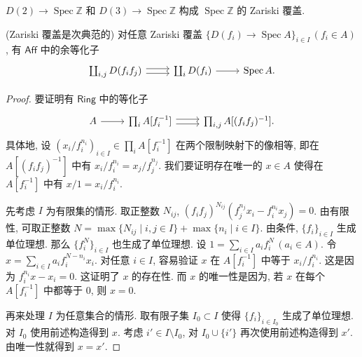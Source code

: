 \documentclass{book}
\begin{document}
	\begin{example}
		{}
		$D(2) \to\operatorname{Spec}\mathbb{Z}$ 和 $D(3) \to \operatorname{Spec} \mathbb{Z}$ 构成 $\operatorname{Spec} \mathbb{Z}$ 的 Zariski 覆盖.
	\end{example}
	
	\begin{prop}
		[label={Zariski-covering-subcanonical}]
		{(Zariski 覆盖是次典范的)}
		对任意 Zariski 覆盖 $\{D(f_i) \to \operatorname{Spec} A\}_{i\in I}\,(f_i\in A)$, 有 $\mathsf{Aff}$ 中的余等化子
		\[\begin{tikzcd}[ampersand replacement=\&]
			{\coprod_{i,j}D(f_if_j)} \& {\coprod_i D(f_i)} \& {\operatorname{Spec} A.}
			\arrow[shift right, from=1-1, to=1-2]
			\arrow[shift left, from=1-1, to=1-2]
			\arrow[from=1-2, to=1-3]
		\end{tikzcd}\]
	\end{prop}
	\begin{proof}
		要证明有 $\mathsf{Ring}$ 中的等化子
		\[\begin{tikzcd}[ampersand replacement=\&]
			A \& {\prod_i A[f_i^{-1}]} \& {\prod_{i,j}A[(f_if_j)^{-1}].}
			\arrow[from=1-1, to=1-2]
			\arrow[shift left, from=1-2, to=1-3]
			\arrow[shift right, from=1-2, to=1-3]
		\end{tikzcd}\]
		具体地, 设 $(x_i/f_i^{n_i})_{i\in I}\in \prod_i A[f_i^{-1}]$ 在两个限制映射下的像相等, 即在 $A[(f_if_j)^{-1}]$ 中有 $x_i/f_i^{n_i} = x_j/f_j^{n_j}$.
		我们要证明存在唯一的 $x\in A$ 使得在 $A[f_i^{-1}]$ 中有 $x/1=x_i/f_i^{n_i}$.
		
		先考虑 $I$ 为有限集的情形.
		取正整数 $N_{ij}$,
		$(f_if_j)^{N_{ij}} (f_j^{n_j}x_i-f_i^{n_i}x_j)=0$.
		由有限性, 可取正整数 $N=\max\{N_{ij}\mid i,j\in I\}+\max\{n_i\mid i\in I\}$.
		由条件, $\{f_i\}_{i\in I}$ 生成单位理想.
		那么 $\{f_i^N\}_{i\in I}$ 也生成了单位理想.
		设 $1=\sum_{i\in I} a_if_i^N\,(a_i\in A)$.
		令 $x = \sum_{i\in I} a_if_i^{N-n_i}x_i$.
		对任意 $i\in I$,
		容易验证 $x$ 在 $A[f_i^{-1}]$ 中等于 $x_i/f_i^{n_i}$.%
		这是因为 $f_i^{n_i}x-x_i=0$.
		这证明了 $x$ 的存在性.
		而 $x$ 的唯一性是因为, 若 $x$ 在每个 $A[f_i^{-1}]$ 中都等于 $0$, 则 $x=0$.
		
		再来处理 $I$ 为任意集合的情形. 取有限子集 $I_0\subset I$ 使得 $\{f_i\}_{i\in I_0}$ 生成了单位理想. 对 $I_0$ 使用前述构造得到 $x$. 考虑 $i'\in I\setminus I_0$, 对 $I_0\cup \{i'\}$ 再次使用前述构造得到 $x'$. 由唯一性就得到 $x=x'$.
	\end{proof}
	
\end{document}
